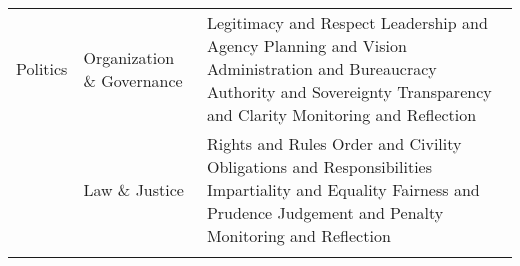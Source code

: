 \begin{table}[th]
\begin{center}
\begin{tabular}{ >{\raggedright\arraybackslash}p{} >{\raggedright\arraybackslash}p{} >{\raggedright\arraybackslash}p{} }
\hline
Politics & Organization \& Governance & Legitimacy and Respect \linebreak Leadership and Agency \linebreak Planning and Vision \linebreak Administration and Bureaucracy \linebreak Authority and Sovereignty \linebreak Transparency and Clarity \linebreak Monitoring and Reflection \linebreak \\
  & Law \& Justice & Rights and Rules \linebreak Order and Civility \linebreak Obligations and Responsibilities \linebreak Impartiality and Equality \linebreak Fairness and Prudence \linebreak Judgement and Penalty \linebreak Monitoring and Reflection \\
\hline
\label{tbl:incomesByUfarmens2}
\end{tabular}
\end{center}
\end{table}

